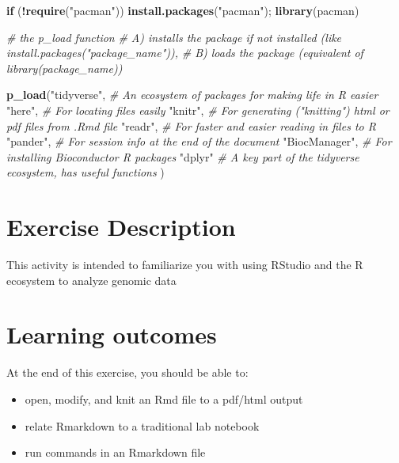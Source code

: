 \documentclass[
]{book}
\newenvironment{Shaded}{\begin{snugshade}}{\end{snugshade}}
\newcommand{\CommentTok}[1]{\textcolor[rgb]{0.56,0.35,0.01}{\textit{#1}}}
\newcommand{\ControlFlowTok}[1]{\textcolor[rgb]{0.13,0.29,0.53}{\textbf{#1}}}
\newcommand{\FunctionTok}[1]{\textcolor[rgb]{0.13,0.29,0.53}{\textbf{#1}}}
\newcommand{\NormalTok}[1]{#1}
\newcommand{\SpecialCharTok}[1]{\textcolor[rgb]{0.81,0.36,0.00}{\textbf{#1}}}
\newcommand{\StringTok}[1]{\textcolor[rgb]{0.31,0.60,0.02}{#1}}
\providecommand{\tightlist}{%
  \setlength{\itemsep}{0pt}\setlength{\parskip}{0pt}}
\begin{document}
\begin{Shaded}
\begin{Highlighting}[]
\ControlFlowTok{if}\NormalTok{ (}\SpecialCharTok{!}\FunctionTok{require}\NormalTok{(}\StringTok{"pacman"}\NormalTok{)) }\FunctionTok{install.packages}\NormalTok{(}\StringTok{"pacman"}\NormalTok{); }\FunctionTok{library}\NormalTok{(pacman)}

\CommentTok{\# the p\_load function }
\CommentTok{\#    A) installs the package if not installed (like install.packages("package\_name")),}
\CommentTok{\#    B) loads the package (equivalent of library(package\_name))}

\FunctionTok{p\_load}\NormalTok{(}\StringTok{"tidyverse"}\NormalTok{, }\CommentTok{\# An ecosystem of packages for making life in R easier}
       \StringTok{"here"}\NormalTok{, }\CommentTok{\# For locating files easily}
       \StringTok{"knitr"}\NormalTok{, }\CommentTok{\# For generating ("knitting") html or pdf files from .Rmd file}
       \StringTok{"readr"}\NormalTok{, }\CommentTok{\# For faster and easier reading in files to R}
       \StringTok{"pander"}\NormalTok{, }\CommentTok{\# For session info at the end of the document}
       \StringTok{"BiocManager"}\NormalTok{, }\CommentTok{\# For installing Bioconductor R packages}
       \StringTok{"dplyr"} \CommentTok{\# A key part of the tidyverse ecosystem, has useful functions}
\NormalTok{       )}
\end{Highlighting}
\end{Shaded}

\hypertarget{exercise-description}{%
\section{Exercise Description}\label{exercise-description}}

This activity is intended to familiarize you with using RStudio and the R ecosystem to analyze genomic data

\hypertarget{learning-outcomes}{%
\section{Learning outcomes}\label{learning-outcomes}}

At the end of this exercise, you should be able to:

\begin{itemize}
\tightlist
\item
  open, modify, and knit an Rmd file to a pdf/html output
\item
  relate Rmarkdown to a traditional lab notebook
\item
  run commands in an Rmarkdown file
\end{itemize}
\end{document}
